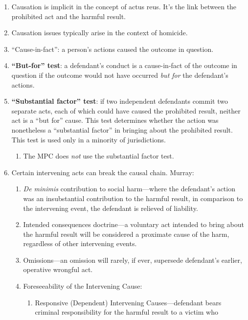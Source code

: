 \begin{enumerate}
    \item Causation is implicit in the concept of actus reus. It's the link 
    between the prohibited act and the harmful result.
    \item Causation issues typically arise in the context of homicide.
    \item ``Cause-in-fact'': a person's actions caused the outcome in 
    question.
    \item \textbf{``But-for'' test}: a defendant's conduct is a cause-in-fact 
    of the outcome in question if the outcome would not have occurred 
    \emph{but for} the defendant's actions.
    \item \textbf{``Substantial factor'' test}: if two independent defendants 
    commit two separate acts, each of which could have caused the prohibited 
    result, neither act is a ``but for'' cause. This test determines whether 
    the action was nonetheless a ``substantial factor'' in bringing about the 
    prohibited result. This test is used only in a minority of jurisdictions.
    \begin{enumerate}
        \item The MPC does \emph{not} use the substantial factor test.
    \end{enumerate}
    \item Certain intervening acts can break the causal chain. Murray: 
    \begin{enumerate}
        \item \emph{De minimis} contribution to social harm---where the 
        defendant's action was an insubstantial contribution to the harmful 
        result, in comparison to the intervening event, the defendant is 
        relieved of liability.
        \item Intended consequences doctrine---a voluntary act intended to 
        bring about the harmful result will be considered a proximate cause of 
        the harm, regardless of other intervening events.
        \item Omissions---an omission will rarely, if ever, supersede 
        defendant's earlier, operative wrongful act.
        \item Foreseeability of the Intervening Cause:
        \begin{enumerate}
            \item Responsive (Dependent) Intervening Causes---defendant bears 
            criminal responsibility for the harmful result to a victim who 

\end{enumerate}
\end{enumerate}
\end{enumerate}

